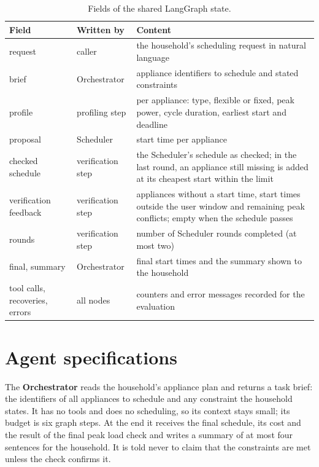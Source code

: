 \documentclass[12pt,a4paper]{report}
\begin{document}
\begin{table}[h!]
\caption{Fields of the shared LangGraph state.}
\label{tab:state}
\small
\begin{tabularx}{\textwidth}{llX}
\toprule
Field & Written by & Content \\
\midrule
request & caller & the household's scheduling request in natural language \\
brief & Orchestrator & appliance identifiers to schedule and stated constraints \\
profile & profiling step & per appliance: type, flexible or fixed, peak power, cycle duration, earliest start and deadline \\
proposal & Scheduler & start time per appliance \\
checked schedule & verification step & the Scheduler's schedule as checked; in the last round, an appliance still missing is added at its cheapest start within the limit \\
verification feedback & verification step & appliances without a start time, start times outside the user window and remaining peak conflicts; empty when the schedule passes \\
rounds & verification step & number of Scheduler rounds completed (at most two) \\
final, summary & Orchestrator & final start times and the summary shown to the household \\
tool calls, recoveries, errors & all nodes & counters and error messages recorded for the evaluation \\
\bottomrule
\end{tabularx}
\end{table}

\section{Agent specifications}

The \textbf{Orchestrator} reads the household's appliance plan and
returns a task brief: the identifiers of all appliances to schedule and
any constraint the household states. It has no tools and does no
scheduling, so its context stays small; its budget is six graph steps.
At the end it receives the final schedule, its cost and the result of
the final peak load check and writes a summary of at most four
sentences for the household. It is told never to claim that the
constraints are met unless the check confirms it.
\end{document}
